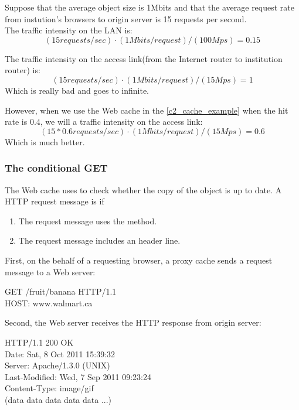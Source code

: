 Suppose that the average object size is 1Mbits and that the average request rate from instution's
browsers to origin server is 15 requests per second.\\
The traffic intensity on the LAN is:
\begin{equation}
    (15 requests/sec) \cdot (1 Mbits/request) / (100Mps) = 0.15
    \label{c2_lan_traffic_intensity}
\end{equation}

The traffic intensity on the access link(from the Internet router to institution
router) is:
\begin{equation}
    (15 requests/sec) \cdot (1 Mbits/request) / (15Mps) = 1
    \label{c2_accessLink_traffic_intensity}
\end{equation}
Which is really bad and goes to infinite.

However, when we use the Web cache in the \autoref{c2_cache_example} when the hit rate is 0.4,
we will a traffic intensity on the access link:
\begin{equation}
    (15*0.6 requests/sec) \cdot (1 Mbits/request) / (15Mps) =0.6
\end{equation}
Which is much better.

\subsubsection{The conditional \textbf{GET}}

\hf
The Web cache uses  to check whether the copy of the object is up to date.
A HTTP request message is  if
\begin{enumerate}
    \item The request message uses the  method.
    \item The request message includes an  header line.
\end{enumerate}

First, on the behalf of a requesting browser, a proxy cache sends a request message
to a Web server:

\begin{center}
    GET /fruit/banana HTTP/1.1\\
    HOST: www.walmart.ca
\end{center}

Second, the Web server receives the HTTP response from origin server:

\begin{center}
    HTTP/1.1 200 OK\\
    Date: Sat, 8 Oct 2011 15:39:32\\
    Server: Apache/1.3.0 (UNIX)\\
    Last-Modified: Wed, 7 Sep 2011 09:23:24\\
    Content-Type: image/gif\\
    (data data data data data ...)
\end{center}

